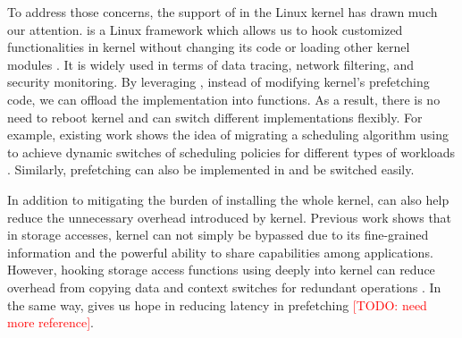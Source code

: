 To address those concerns, the support of \ebpf in the Linux kernel has drawn much our attention. \ebpf is a Linux framework which allows us to hook customized functionalities in kernel without changing its code or loading other kernel modules \cite{ebpf}. It is widely used in terms of data tracing, network filtering, and security monitoring. By leveraging \ebpf, instead of modifying kernel's prefetching code, we can offload the implementation into \ebpf functions. 
As a result, there is no need to reboot kernel and can switch different implementations flexibly. For example, existing work shows the idea of migrating a scheduling algorithm using \ebpf to achieve dynamic switches of scheduling policies for different types of workloads \cite{ghOSt_ebpf}. Similarly, prefetching can also be implemented in \ebpf and be switched easily.

In addition to mitigating the burden of installing the whole kernel, \ebpf can also help reduce the unnecessary overhead introduced by kernel. Previous work shows that in storage accesses, kernel can not simply be bypassed due to its fine-grained information and the powerful ability to share capabilities among applications.
 However, hooking storage access functions using \ebpf deeply into kernel can reduce overhead from copying data and context switches for redundant operations \cite{XRP, BPF_storage}. In the same way, \ebpf gives us hope in reducing latency in prefetching \textcolor{red}{[TODO: need more reference]}. 


